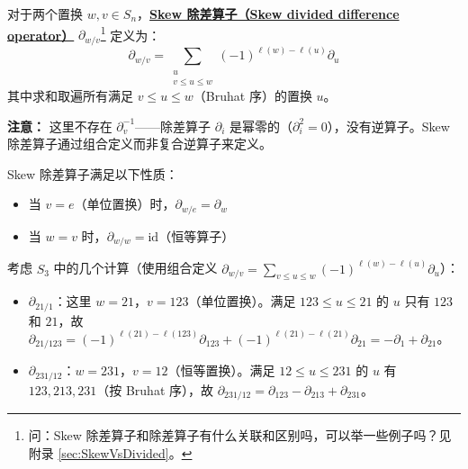 \begin{Definition}
\label{def:SkewDividedDifference}
对于两个置换 $w, v \in S_n$，\textbf{\underline{Skew 除差算子（Skew divided difference operator）}} $\partial_{w/v}$\footnote{问：Skew 除差算子和除差算子有什么关联和区别吗，可以举一些例子吗？见附录 \cref{sec:SkewVsDivided}。} 定义为：
\begin{equation}
\partial_{w/v} = \sum_{\substack{u \\ v \leq u \leq w}} (-1)^{\ell(w)-\ell(u)} \partial_u
\end{equation}
其中求和取遍所有满足 $v \leq u \leq w$（Bruhat 序）的置换 $u$。

\textbf{注意：} 这里不存在 $\partial_v^{-1}$——除差算子 $\partial_i$ 是幂零的（$\partial_i^2 = 0$），没有逆算子。Skew 除差算子通过组合定义而非复合逆算子来定义。

Skew 除差算子满足以下性质：
\begin{itemize}
\item 当 $v = e$（单位置换）时，$\partial_{w/e} = \partial_w$
\item 当 $w = v$ 时，$\partial_{w/w} = \mathrm{id}$（恒等算子）
\end{itemize}
\end{Definition}

\begin{Example}
\label{ex:SkewDividedDifference}
考虑 $S_3$ 中的几个计算（使用组合定义 $\partial_{w/v} = \sum_{v \leq u \leq w} (-1)^{\ell(w)-\ell(u)} \partial_u$）：
\begin{itemize}
\item $\partial_{21/1}$：这里 $w = 21$，$v = 123$（单位置换）。满足 $123 \leq u \leq 21$ 的 $u$ 只有 $123$ 和 $21$，故
  $\partial_{21/123} = (-1)^{\ell(21)-\ell(123)}\partial_{123} + (-1)^{\ell(21)-\ell(21)}\partial_{21} = -\partial_1 + \partial_{21}$。

\item $\partial_{231/12}$：$w = 231$，$v = 12$（恒等置换）。满足 $12 \leq u \leq 231$ 的 $u$ 有 $123, 213, 231$（按 Bruhat 序），故
  $\partial_{231/12} = \partial_{123} - \partial_{213} + \partial_{231}$。
\end{itemize}
\end{Example}

